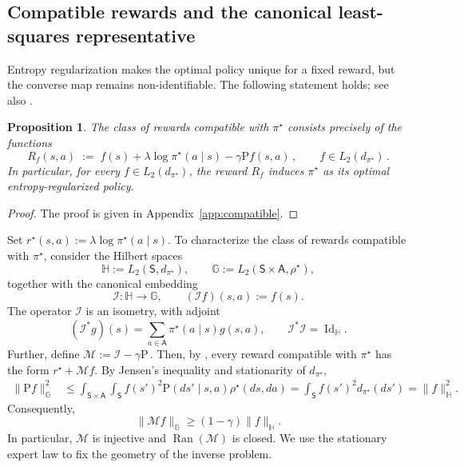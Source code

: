 \documentclass{article}
\newtheorem{proposition}{Proposition}[section]
\theoremstyle{definition}
\theoremstyle{remark}
\theoremstyle{plain}
\newcommand{\MKQ}{\mathrm{P}}
\def\eqsp{\,}
\numberwithin{equation}{section}
\begin{document}
\subsection{Compatible rewards and the canonical least-squares representative}
\label{subsec:canonical-LS}

Entropy regularization makes the optimal policy unique for a fixed reward, but the converse map remains non-identifiable. The following statement holds; see also \cite{cao2021identifiability}.  

\begin{proposition}
\label{prop:reward shaping lemma}
The class of rewards compatible with \(\pi^\star\) consists precisely of
the functions
\begin{equation}
\label{eq:R_f}
R_f(s,a) \;:=\; f(s) + \lambda \log \pi^\star(a \mid s) 
- \gamma \MKQ f(s, a)\eqsp, \qquad f\in L_2(d_{\pi^\star})\eqsp.
\end{equation}
In particular, for every \(f\in L_2(d_{\pi^\star})\), the reward \(R_f\)
induces \(\pi^\star\) as its optimal entropy-regularized policy.
\end{proposition}
\begin{proof}
    The proof is given in Appendix~\ref{app:compatible}.
\end{proof}
Set
\(
    r^\star(s,a):=\lambda\log\pi^\star(a\mid s).
\)
To characterize the class of rewards compatible with $\pi^\star$, consider the Hilbert spaces
\begin{equation}
\label{eq:HG-spaces}
    \mathbb H:=L_2(\mathsf S,d_{\pi^\star}),
    \qquad
    \mathbb G:=L_2(\mathsf S\times\mathsf A,\rho^\star),
\end{equation}
together with the canonical embedding
\[
    \mathcal I:\mathbb H\to\mathbb G,
    \qquad
    (\mathcal I f)(s,a):=f(s).
\]
The operator $\mathcal I$ is an isometry, with adjoint
\begin{equation}
\label{eq:I-adjoint}
    (\mathcal I^\ast g)(s)
    =
    \sum_{a\in\mathsf A}\pi^\star(a\mid s)g(s,a),
    \qquad
    \mathcal I^\ast\mathcal I=\operatorname{Id}_{\mathbb H}.
\end{equation}
Further, define \(\mathcal M:=\mathcal I-\gamma\MKQ\eqsp.\)
Then, by , every reward compatible with $\pi^\star$ has the form
\(    r^\star+\mathcal M f.
\)
By Jensen's inequality and stationarity of \(d_{\pi^{\star}}\),
\begin{align}
\label{eq:P-is-contraction}
    \|\MKQ f\|_{\mathbb G}^{2}
    &\leq
    \int_{\mathsf S\times\mathsf A}
    \int_{\mathsf S}f(s')^2 \MKQ (ds'\mid s,a)\rho^\star(ds,da)
    =
    \int_{\mathsf S}f(s')^2d_{\pi^{\star}}(ds')
    =
    \|f\|_{\mathbb H}^{2}.
\end{align}
Consequently,
\begin{equation}
\label{eq:M-lower-bound}
    \|\mathcal M f\|_{\mathbb G}
    \geq
    (1-\gamma)\|f\|_{\mathbb H}.
\end{equation}
In particular, $\mathcal M$ is injective and $\operatorname{Ran}(\mathcal M)$ is closed. We use the stationary expert law to fix the geometry of the inverse problem.
\end{document}
